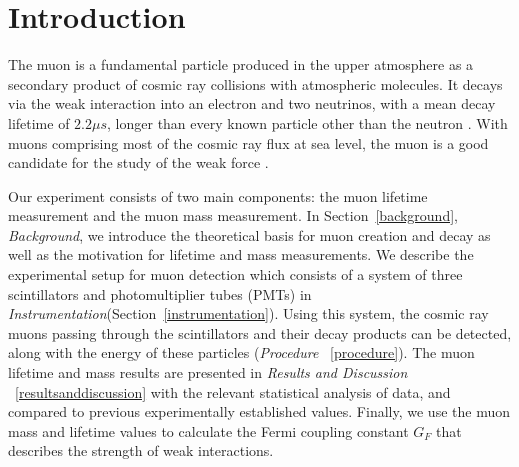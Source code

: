 
\section{Introduction}\label{introduction}

The muon is a fundamental particle produced in the upper atmosphere as
a secondary product of cosmic ray collisions with atmospheric
molecules. It decays via the weak interaction into an electron and two
neutrinos, with a mean decay lifetime of $2.2 \mu s$, longer than
every known particle other than the neutron \cite{pdg}. With muons
comprising most of the cosmic ray flux at sea level, the muon is a
good candidate for the study of the weak force \cite[p.~8]{rossi}.

Our experiment consists of two main components: the muon lifetime
measurement and the muon mass measurement. In
Section~\ref{background}, \emph{Background}, we introduce the
theoretical basis for muon creation and decay as well as the
motivation for lifetime and mass measurements. We describe the
experimental setup for muon detection which consists of a system of
three scintillators and photomultiplier tubes (PMTs) in
\emph{Instrumentation}(Section~\ref{instrumentation}). Using this
system, the cosmic ray muons passing through the scintillators and
their decay products can be detected, along with the energy of these
particles (\emph{Procedure} ~\ref{procedure}). The muon lifetime and
mass results are presented in \emph{Results and Discussion}
~\ref{resultsanddiscussion} with the relevant statistical analysis of
data, and compared to previous experimentally established
values. Finally, we use the muon mass and lifetime values to calculate
the Fermi coupling constant $G_F$ that describes the strength of weak
interactions.
